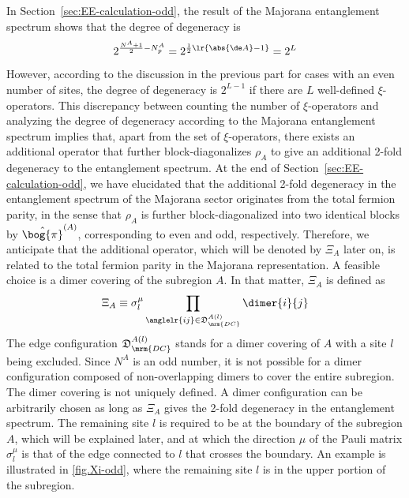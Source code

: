 In Section~\ref{sec:EE-calculation-odd}, the result of the Majorana entanglement spectrum shows that the degree of degeneracy is 
\[
2^{\frac{N^A+1}{2}-N^A_p} = 2^{\frac{1}{2}\lr{\abs{\de A} - 1}} = 2^L
\]
However, according to the discussion in the previous part for cases with an even number of sites, the degree of degeneracy is $2^{L-1}$ if there are $L$ well-defined $\xi$-operators. This discrepancy between counting the number of $\xi$-operators and analyzing the degree of degeneracy according to the Majorana entanglement spectrum implies that, apart from the set of $\xi$-operators, there exists an additional operator that further block-diagonalizes $\rho_A$ to give an additional 2-fold degeneracy to the entanglement spectrum. At the end of Section~\ref{sec:EE-calculation-odd}, we have elucidated that the additional 2-fold degeneracy in the entanglement spectrum of the Majorana sector originates from the total fermion parity, in the sense that $\rho_A$ is further block-diagonalized into two identical blocks by $\hat{\bog{\pi}}^{(A)}$, corresponding to even and odd, respectively. Therefore, we anticipate that the additional operator, which will be denoted by $\Xi_A$ later on, is related to the total fermion parity in the Majorana representation. A feasible choice is a dimer covering of the subregion $A$. In that matter, $\Xi_A$ is defined as
\begin{equation}\label{equ.Xi-def}
    \Xi_A \equiv \sigma^\mu_l \prod_{\anglelr{ij}\in\mathfrak{D}_{\mrm{DC}}^{A(l)}}\dimer{i}{j}
\end{equation}
The edge configuration $\mathfrak{D}_{\mrm{DC}}^{A(l)}$ stands for a dimer covering of $A$ with a site $l$ being excluded. Since $N^A$ is an odd number, it is not possible for a dimer configuration composed of non-overlapping dimers to cover the entire subregion. The dimer covering is not uniquely defined. A dimer configuration can be arbitrarily chosen as long as $\Xi_A$ gives the 2-fold degeneracy in the entanglement spectrum. The remaining site $l$ is required to be at the boundary of the subregion $A$, which will be explained later, and at which the direction $\mu$ of the Pauli matrix $\sigma_l^\mu$ is that of the edge connected to $l$ that crosses the boundary. An example is illustrated in \autoref{fig.Xi-odd}, where the remaining site $l$ is in the upper portion of the subregion. 


